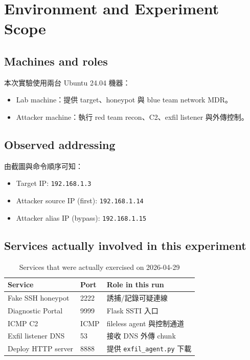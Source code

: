 \documentclass[UTF8,11pt]{ctexart}
\begin{document}
\section{Environment and Experiment Scope}

\subsection{Machines and roles}
本次實驗使用兩台 Ubuntu 24.04 機器：
\begin{itemize}[leftmargin=*]
  \item Lab machine：提供 target、honeypot 與 blue team network MDR。
  \item Attacker machine：執行 red team recon、C2、exfil listener 與外傳控制。
\end{itemize}

\subsection{Observed addressing}
由截圖與命令順序可知：
\begin{itemize}[leftmargin=*]
  \item Target IP: \texttt{192.168.1.3}
  \item Attacker source IP (first): \texttt{192.168.1.14}
  \item Attacker alias IP (bypass): \texttt{192.168.1.15}
\end{itemize}

\subsection{Services actually involved in this experiment}
\begin{table}[H]
\centering
\begin{tabular}{lll}
\toprule
Service & Port & Role in this run \\
\midrule
Fake SSH honeypot & 2222 & 誘捕/記錄可疑連線 \\
Diagnostic Portal & 9999 & Flask SSTI 入口 \\
ICMP C2 & ICMP & fileless agent 與控制通道 \\
Exfil listener DNS & 53 & 接收 DNS 外傳 chunk \\
Deploy HTTP server & 8888 & 提供 \texttt{exfil\_agent.py} 下載 \\
\bottomrule
\end{tabular}
\caption{Services that were actually exercised on 2026-04-29}
\end{table}
\end{document}
